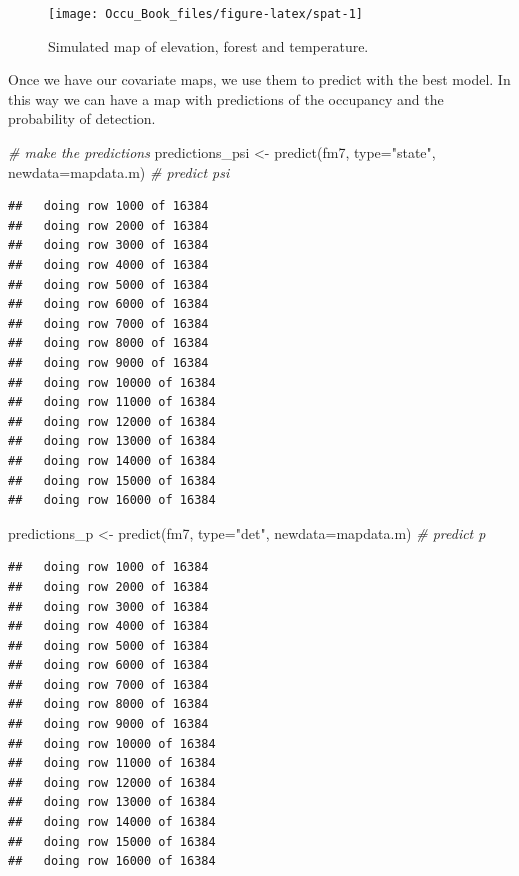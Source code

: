 \documentclass[
]{book}
\newenvironment{Shaded}{\begin{snugshade}}{\end{snugshade}}
\newcommand{\AttributeTok}[1]{\textcolor[rgb]{0.77,0.63,0.00}{#1}}
\newcommand{\CommentTok}[1]{\textcolor[rgb]{0.56,0.35,0.01}{\textit{#1}}}
\newcommand{\FunctionTok}[1]{\textcolor[rgb]{0.00,0.00,0.00}{#1}}
\newcommand{\NormalTok}[1]{#1}
\newcommand{\OtherTok}[1]{\textcolor[rgb]{0.56,0.35,0.01}{#1}}
\newcommand{\StringTok}[1]{\textcolor[rgb]{0.31,0.60,0.02}{#1}}
\begin{document}
\begin{figure}
\texttt{[image: Occu\_Book\_files/figure-latex/spat-1]} \caption[fig]{Simulated map of elevation, forest and temperature.}\label{fig:spat}
\end{figure}

Once we have our covariate maps, we use them to predict with the best model. In this way we can have a map with predictions of the occupancy and the probability of detection.

\begin{Shaded}
\begin{Highlighting}[]
\CommentTok{\# make the predictions }
\NormalTok{predictions\_psi }\OtherTok{\textless{}{-}} \FunctionTok{predict}\NormalTok{(fm7, }\AttributeTok{type=}\StringTok{"state"}\NormalTok{, }\AttributeTok{newdata=}\NormalTok{mapdata.m) }\CommentTok{\# predict psi}
\end{Highlighting}
\end{Shaded}

\begin{verbatim}
##   doing row 1000 of 16384 
##   doing row 2000 of 16384 
##   doing row 3000 of 16384 
##   doing row 4000 of 16384 
##   doing row 5000 of 16384 
##   doing row 6000 of 16384 
##   doing row 7000 of 16384 
##   doing row 8000 of 16384 
##   doing row 9000 of 16384 
##   doing row 10000 of 16384 
##   doing row 11000 of 16384 
##   doing row 12000 of 16384 
##   doing row 13000 of 16384 
##   doing row 14000 of 16384 
##   doing row 15000 of 16384 
##   doing row 16000 of 16384
\end{verbatim}

\begin{Shaded}
\begin{Highlighting}[]
\NormalTok{predictions\_p   }\OtherTok{\textless{}{-}} \FunctionTok{predict}\NormalTok{(fm7, }\AttributeTok{type=}\StringTok{"det"}\NormalTok{,   }\AttributeTok{newdata=}\NormalTok{mapdata.m) }\CommentTok{\# predict p}
\end{Highlighting}
\end{Shaded}

\begin{verbatim}
##   doing row 1000 of 16384 
##   doing row 2000 of 16384 
##   doing row 3000 of 16384 
##   doing row 4000 of 16384 
##   doing row 5000 of 16384 
##   doing row 6000 of 16384 
##   doing row 7000 of 16384 
##   doing row 8000 of 16384 
##   doing row 9000 of 16384 
##   doing row 10000 of 16384 
##   doing row 11000 of 16384 
##   doing row 12000 of 16384 
##   doing row 13000 of 16384 
##   doing row 14000 of 16384 
##   doing row 15000 of 16384 
##   doing row 16000 of 16384
\end{verbatim}
\end{document}
